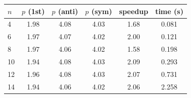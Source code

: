 \begin{tabular}{lccccc}
\toprule
$n$ & $p$ (1st) & $p$ (anti) & $p$ (sym) & speedup & time (s) \\
\midrule
4 & 1.98 & 4.08 & 4.03 & 1.68 & 0.081 \\
6 & 1.97 & 4.07 & 4.02 & 2.00 & 0.121 \\
8 & 1.97 & 4.06 & 4.02 & 1.58 & 0.198 \\
10 & 1.94 & 4.08 & 4.03 & 2.09 & 0.293 \\
12 & 1.96 & 4.08 & 4.03 & 2.07 & 0.731 \\
14 & 1.94 & 4.06 & 4.02 & 2.06 & 2.258 \\
\bottomrule
\end{tabular}
